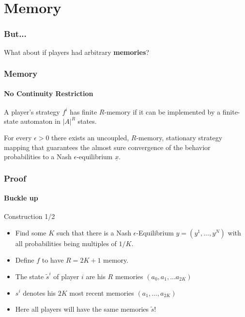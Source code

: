\documentclass{beamer}
\newcommand{\eq}[1]{\underline{#1}}
\begin{document}

\section{Memory}

\begin{frame}
    \frametitle{But...}
    \begin{center}
        What about if players had arbitrary \textbf{memories}?
    \end{center} 
\end{frame}

\begin{frame}
    \frametitle{Memory}
    \framesubtitle{No Continuity Restriction}
    \begin{definition}
        A player's strategy $f^i$ has finite $R$-memory if it can be implemented by a finite-state 
        automaton in $|A|^R$ states.
    \end{definition}
    \pause
    \begin{theorem}
        For every $\epsilon > 0$ there exists an uncoupled, $R$-memory,
        stationary strategy mapping that guarantees the
        almost sure convergence of the behavior probabilities to a Nash $\epsilon$-equilibrium $\eq{x}$.
    \end{theorem}
\end{frame}


\begin{frame}
    \frametitle{Proof}
    \framesubtitle{Buckle up}

    \begin{exampleblock}{Construction 1/2}
        \begin{itemize}
            \item<1-> Find some $K$ such that there is a Nash $\epsilon$-Equilibrium $y = (y^1, ..., y^N)$
		    with all probabilities being multiples of $1/K$.
            \item<2-> Define $f$ to have $R = 2K + 1$ memory.
        \end{itemize}
    \end{exampleblock}
    \begin{definition}
        \begin{itemize}
            \item<3-> The state $\tilde{s}^i$ of player $i$ are his $R$ memories
                $(a_0, a_1, ... a_{2K})$
            \item<4-> $s^i$ denotes his $2K$ most recent memories $(a_1, ..., a_{2K})$ 
            \item<5- | alert@5> Here all players will have the same memories $\tilde{s}$!
        \end{itemize}
    \end{definition}
\end{frame}
\end{document}
